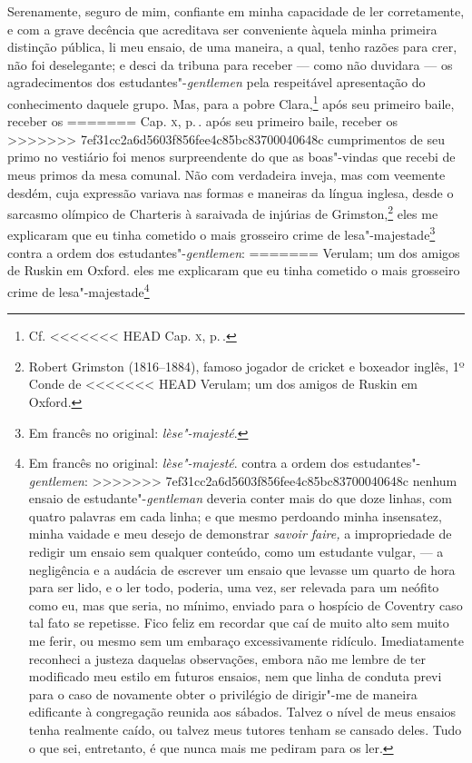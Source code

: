 {{{{{{{{{{{{{{{{{{{{{{{{{{{{{{{{{{{{{{{{{{{{{{{{{{{{{{{{{{{{{{{{{{{{{{{{{{{{{{{{{{{{{{{{{{{{{{{{%
Serenamente, seguro de mim, confiante em minha capacidade de ler
corretamente, e com a grave decência que acreditava ser conveniente
àquela minha primeira distinção pública, li meu ensaio, de uma maneira,
a qual, tenho razões para crer, não foi deselegante; e desci da tribuna
para receber --- como não duvidara --- os agradecimentos dos
estudantes"-\textit{gentlemen} pela respeitável apresentação do
conhecimento daquele grupo. Mas, para a pobre Clara,\footnote{Cf.
<<<<<<< HEAD
  Cap. \textsc{x}, p.\,\pageref{212}.} após seu primeiro baile, receber os
=======
  Cap. \textsc{x}, p.\,\pageref{212}.  após seu primeiro baile, receber os
>>>>>>> 7ef31cc2a6d5603f856fee4c85bc83700040648c
cumprimentos de seu primo no vestiário foi menos surpreendente do que as
boas"-vindas que recebi de meus primos da mesa comunal. Não com
verdadeira inveja, mas com veemente desdém, cuja expressão variava nas
formas e maneiras da língua inglesa, desde o sarcasmo olímpico de \label{tom}
Charteris à saraivada de injúrias de Grimston,\footnote{Robert Grimston
  (1816--1884), famoso jogador de cricket e boxeador inglês, 1º Conde de
<<<<<<< HEAD
  Verulam; um dos amigos de Ruskin em Oxford.} eles me
explicaram que eu tinha cometido o mais grosseiro crime de
lesa"-majestade\footnote{Em francês no original: \textit{lèse"-majesté}.} contra a ordem dos estudantes"-\textit{gentlemen}:
=======
  Verulam; um dos amigos de Ruskin em Oxford.  eles me
explicaram que eu tinha cometido o mais grosseiro crime de
lesa"-majestade\footnote{Em francês no original: \textit{lèse"-majesté}.
   contra a ordem dos estudantes"-\textit{gentlemen}:
>>>>>>> 7ef31cc2a6d5603f856fee4c85bc83700040648c
nenhum ensaio de estudante"-\textit{gentleman} deveria conter mais do que
doze linhas, com quatro palavras em cada linha; e que mesmo perdoando
minha insensatez, minha vaidade e meu desejo de demonstrar \textit{savoir
faire,} a impropriedade de redigir um ensaio sem qualquer conteúdo, como
um estudante vulgar, --- a negligência e a audácia de escrever um ensaio
que levasse um quarto de hora para ser lido, e o ler todo, poderia, uma
vez, ser relevada para um neófito como eu, mas que seria, no mínimo,
enviado para o hospício de Coventry caso tal fato se repetisse. Fico
feliz em recordar que caí de muito alto sem muito me ferir, ou mesmo sem
um embaraço excessivamente ridículo. Imediatamente reconheci a justeza
daquelas observações, embora não me lembre de ter modificado meu estilo
em futuros ensaios, nem que linha de conduta previ para o caso de
novamente obter o privilégio de dirigir"-me de maneira edificante à
congregação reunida aos sábados. Talvez o nível de meus ensaios tenha
realmente caído, ou talvez meus tutores tenham se cansado deles. Tudo o
que sei, entretanto, é que nunca mais me pediram para os ler.

}}}}}}}}}}}}}}}}}}}}}}}}}}}}}}}}}}}}}}}}}}}}}}}}}}}}}}}}}}}}}}}}}}}}}}}}}}}}}}}}}}}}}}}}}}}}}}}}}
